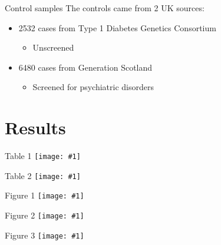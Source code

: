 \documentclass{beamer}
\newcommand*{\solo}[1]{\centering\texttt{[image: \#1]}}
\begin{document}
\begin{frame}{Control samples}
    The controls came from 2 UK sources:
    \begin{itemize}
        \item 2532 cases from Type 1 Diabetes Genetics Consortium
            \begin{itemize}
                \item Unscreened
            \end{itemize}
        \item 6480 cases from Generation Scotland
            \begin{itemize}
                \item Screened for psychiatric disorders
            \end{itemize}
    \end{itemize}
\end{frame}

\section{Results}
\begin{frame}{Table 1}
    \solo{T1.eps}
\end{frame}

\begin{frame}{Table 2}
    \solo{T2.eps}
\end{frame}

\begin{frame}{Figure 1}
    \solo{F1.eps}
\end{frame}

\begin{frame}{Figure 2}
    \solo{F2.eps}
\end{frame}

\begin{frame}{Figure 3}
    \solo{F3.eps}
\end{frame}
\end{document}
